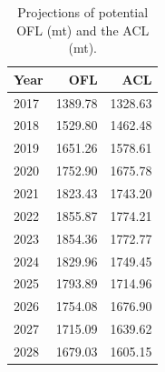 \documentclass[12pt,]{article}
\begin{document}
\begin{table}[ht]
\centering
\caption{Projections of potential OFL (mt) and the ACL (mt).} 
\label{tab:OFL_projection}
\begin{tabular}{lrr}
  \hline
Year & OFL & ACL \\ 
  \hline
2017 & 1389.78 & 1328.63 \\ 
  2018 & 1529.80 & 1462.48 \\ 
  2019 & 1651.26 & 1578.61 \\ 
  2020 & 1752.90 & 1675.78 \\ 
  2021 & 1823.43 & 1743.20 \\ 
  2022 & 1855.87 & 1774.21 \\ 
  2023 & 1854.36 & 1772.77 \\ 
  2024 & 1829.96 & 1749.45 \\ 
  2025 & 1793.89 & 1714.96 \\ 
  2026 & 1754.08 & 1676.90 \\ 
  2027 & 1715.09 & 1639.62 \\ 
  2028 & 1679.03 & 1605.15 \\ 
   \hline
\end{tabular}
\end{table}\begin{table}[ht]
\centering
\caption{Summary of 10-year 
                                             projections beginning in 2019 
                                             for alternate states of nature based on 
                                             an axis of uncertainty for the base model. 
                                             Columns range over low, mid, and high
                                             states of nature, and rows range over different 
                                             assumptions of catch levels. An entry of "--" 
                                             indicates that the stock is driven to very low 
                                             abundance under the particular scenario.} 
\label{tab:Decision_table_mod1}
\end{table}
\end{document}
